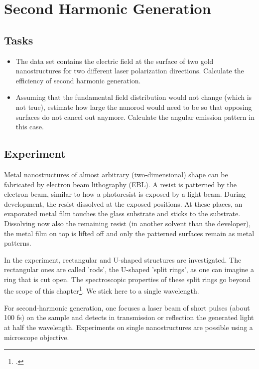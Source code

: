 \renewcommand{\lastmod}{May 22, 2020}
\chapter{Second Harmonic Generation}


\section{Tasks}

\begin{itemize}
\item The data set contains the electric field at the surface of two gold nanostructures for two different laser polarization directions. Calculate the efficiency of second harmonic generation.

\item Assuming that the fundamental field distribution would not change (which is not true), estimate how large the nanorod would need to be so that opposing surfaces do not cancel out anymore. Calculate the angular emission pattern in this case.
\end{itemize}

\section{Experiment}

Metal nanostructures of almost arbitrary (two-dimensional) shape can be fabricated by electron beam lithography (EBL). A resist is patterned by the electron beam, similar to how a photoresist is exposed by a light beam. During development, the resist dissolved at the exposed positions. At these places, an evaporated metal film touches the glass substrate and sticks to the substrate. Dissolving now also the remaining resist (in another solvent than the developer), the metal film on top is lifted off and only the patterned surfaces remain as metal patterns.

In the experiment, rectangular and U-shaped structures are investigated. The rectangular ones are called 'rods', the U-shaped 'split rings', as one can imagine a ring that is cut open. The spectroscopic properties of these split rings go beyond the scope of this chapter\footcite{klein06_science}. We stick here to a single wavelength.

For second-harmonic generation, one focuses a  laser beam of short pulses (about 100 fs) on the sample and detects in transmission or reflection the generated light at half the wavelength. Experiments on single nanostructures are possible using a microscope objective.

